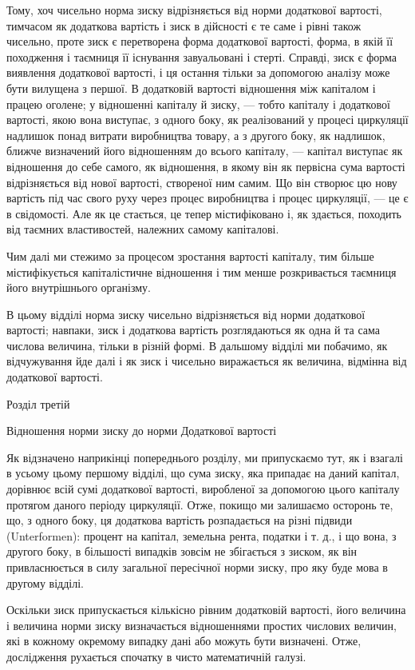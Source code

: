 Тому, хоч чисельно норма зиску відрізняється від норми додаткової
вартості, тимчасом як додаткова вартість і зиск в
дійсності є те саме і рівні також чисельно, проте зиск є перетворена
форма додаткової вартості, форма, в якій її походження
і таємниця її існування завуальовані і стерті. Справді,
зиск є форма виявлення додаткової вартості, і ця остання тільки
за допомогою аналізу може бути вилущена з першої. В додатковій
вартості відношення між капіталом і працею оголене; у
відношенні капіталу й зиску, — тобто капіталу і додаткової вартості,
якою вона виступає, з одного боку, як реалізований у
процесі циркуляції надлишок понад витрати виробництва товару,
а з другого боку, як надлишок, ближче визначений його
відношенням до всього капіталу, — капітал виступає як відношення
до себе самого, як відношення, в якому він як первісна
сума вартості відрізняється від нової вартості, створеної ним
самим. Що він створює цю нову вартість під час свого
руху через процес виробництва і процес циркуляції, — це є в свідомості.
Але як це стається, це тепер містифіковано і, як
здається, походить від таємних властивостей, належних самому
капіталові.

Чим далі ми стежимо за процесом зростання вартості капіталу,
тим більше містифікується капіталістичне відношення і тим
менше розкривається таємниця його внутрішнього організму.

В цьому відділі норма зиску чисельно відрізняється від
норми додаткової вартості; навпаки, зиск і додаткова вартість
розглядаються як одна й та сама числова величина, тільки
в різній формі. В дальшому відділі ми побачимо, як відчужування
йде далі і як зиск і чисельно виражається як величина,
відмінна від додаткової вартості.

Розділ третій

Відношення норми зиску до норми
Додаткової вартості

Як відзначено наприкінці попереднього розділу, ми припускаємо
тут, як і взагалі в усьому цьому першому відділі, що
сума зиску, яка припадає на даний капітал, дорівнює всій сумі
додаткової вартості, виробленої за допомогою цього капіталу
протягом даного періоду циркуляції. Отже, покищо ми залишаємо
осторонь те, що, з одного боку, ця додаткова вартість
розпадається на різні підвиди (Unterformen): процент на капітал,
земельна рента, податки і т. д., і що вона, з другого боку,
в більшості випадків зовсім не збігається з зиском, як він привласнюється
в силу загальної пересічної норми зиску, про яку
буде мова в другому відділі.

Оскільки зиск припускається кількісно рівним додатковій
вартості, його величина і величина норми зиску визначається відношеннями
простих числових величин, які в кожному окремому
випадку дані або можуть бути визначені. Отже, дослідження
рухається спочатку в чисто математичній галузі.
